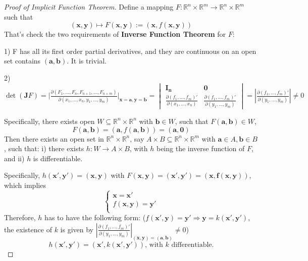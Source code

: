 \begin{proof}[Proof of Implicit Function Theorem]
    Define a mapping $F: \mathbb{R}^{n} \times \mathbb{R}^{m} \to \mathbb{R}^{n} \times \mathbb{R}^{m}$ such that \[
        (\mathbf{x}, \mathbf{y}) \mapsto F(\mathbf{x}, \mathbf{y}) := (\mathbf{x}, f(\mathbf{x,y}))
    \]
    That's check the two requirements of \textbf{Inverse Function Theorem} for $F$:

    1) F has all its first order partial derivatives, and they are continuous on an open set contains $(\mathbf{a, b})$. It is trivial.

    2)$\det (\mathbf{J}F) = \big|\frac{\partial (F_1,\dots,F_n,F_{n+1},\dots,F_{n+m})}{\partial (x_1,\dots,x_n,y_1,\dots,y_m)}\big|_{\mathbf{x=a,y=b}} = \begin{vmatrix}
            \boldsymbol{I_n}                                           & \boldsymbol{0}                                             \\
            \frac{\partial (f_1,\dots,f_m)'}{\partial (x_1,\dots,x_n)} & \frac{\partial (f_1,\dots,f_m)'}{\partial (y_1,\dots,y_m)}
        \end{vmatrix} = \left|\frac{\partial (f_1,\dots,f_m)'}{\partial (y_1,\dots,y_m)}\right| \neq 0$

    Specifically, there exists open $W \subseteq \mathbb{R}^{n} \times \mathbb{R}^{n}$ with $\mathbf{b} \in W$, such that $F(\mathbf{a,b}) \in W$,
    \[
        F(\mathbf{a}, \mathbf{b}) = (\mathbf{a}, f(\mathbf{a,b})) = (\mathbf{a, 0})
    \]
    Then there exists an open set in $\mathbb{R}^{n} \times \mathbb{R}^{n}$, say $A \times B \subseteq \mathbb{R}^{n} \times \mathbb{R}^{m}$ with $\mathbf{a} \in A, \mathbf{b} \in B$, such that:
    i) there exists $h: W \to A \times B$, with $h$ being the inverse function of $F$, and
    ii) $h$ is differentiable.

    Specifically, $h(\mathbf{x',y'}) = (\mathbf{x,y})$ with $F(\mathbf{x,y}) = (\mathbf{x',y'}) = (\mathbf{x, f(\mathbf{x,y})})$, which implies \[
        \left\{\begin{array}{l}
            \mathbf{x} = \mathbf{x'}      \\
            f(\mathbf{x,y}) = \mathbf{y'} \\
        \end{array}\right.
    \]
    Therefore, $h$ has to have the following form: ($f(\mathbf{x',y}) = \mathbf{y'} \Rightarrow  \mathbf{y} = k(\mathbf{x',y'})$, the existence of $k$ is given by $\left|\frac{\partial (f_1,\dots,f_m)'}{\partial (y_1,\dots,y_m)}\right|_{(\mathbf{x,y}) = (\mathbf{a,b})} \neq 0$) \[
        h(\mathbf{x',y'}) = (\mathbf{x'},k(\mathbf{x',y'})), \, \text{with $k$ differentiable}.
    \]


\end{proof}
